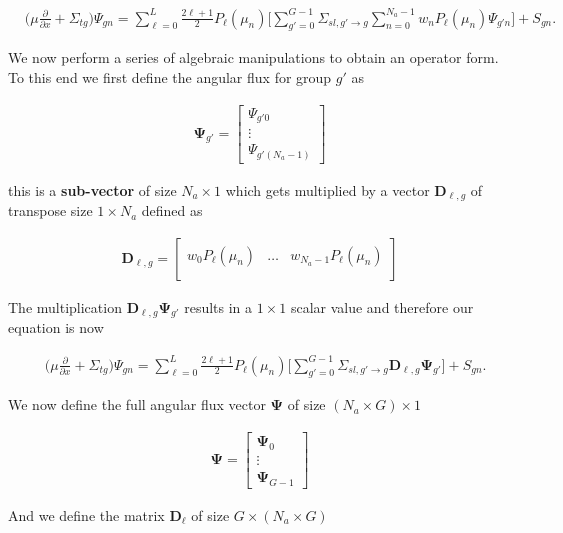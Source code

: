 \documentclass[11pt,letterpaper,titlepage]{article}
\newcommand{\stimes}{{\times}}
\numberwithin{equation}{section}
\newcommand{\beq}{\begin{equation*}
\begin{aligned}}
\newcommand{\eeq}{\end{aligned}
\end{equation*}}
\begin{document}
\begin{equation} 
\begin{aligned}
&\biggr(\mu\frac{\partial}{\partial x} +\Sigma_{tg} \biggr)  \Psi_{gn}
= \sum_{\ell=0}^{L}\frac{2\ell+1}{2}P_\ell(\mu_n)
\biggr[ \sum_{g'=0}^{G-1}
\Sigma_{sl,g'{\to}g} 
  \sum_{n=0}^{N_a-1} w_n P_\ell(\mu_n)\Psi_{g'n}
\biggr]
+  S_{gn}.
\end{aligned}
\end{equation}


We now perform a series of algebraic manipulations to obtain an operator form. To this end we first define the angular flux for group $g'$ as

\beq 
\mathbf{\Psi}_{g'}  = 
\begin{bmatrix}
\Psi_{g'0} \\
\vdots \\
\Psi_{g'(N_a-1)}
\end{bmatrix}
\eeq 

this is a \textbf{sub-vector} of size $N_a \stimes 1$ which gets multiplied by a vector $\mathbf{D}_{\ell,g}$ of transpose size $1\stimes N_a$ defined as

\beq 
\mathbf{D}_{\ell,g}  = 
\begin{bmatrix}
w_0 P_{\ell}(\mu_n) &\hdots &w_{N_a-1} P_{\ell}(\mu_n) \\
\end{bmatrix}
\eeq 

The multiplication $\mathbf{D}_{\ell,g}\mathbf{\Psi}_{g'}$  results in a $1\stimes 1$ scalar value and therefore our equation is now

\begin{equation} 
\begin{aligned}
&\biggr(\mu\frac{\partial}{\partial x} +\Sigma_{tg} \biggr)  \Psi_{gn}
= \sum_{\ell=0}^{L}\frac{2\ell+1}{2}P_\ell(\mu_n)
\biggr[ \sum_{g'=0}^{G-1}
\Sigma_{sl,g'{\to}g} 
\mathbf{D}_{\ell,g} \mathbf{\Psi}_{g'}
\biggr]
+  S_{gn}.
\end{aligned}
\end{equation}

We now define the full angular flux vector $\mathbf{\Psi}$ of size $(N_a\stimes G)\stimes 1$ 

\beq 
\mathbf{\Psi} = 
\begin{bmatrix}
\mathbf{\Psi}_{0} \\ 
\vdots \\
\mathbf{\Psi}_{G-1}
\end{bmatrix}
\eeq 

And we define the matrix $\mathbf{D}_\ell$ of size $G\stimes (N_a \stimes G)$
\end{document}
